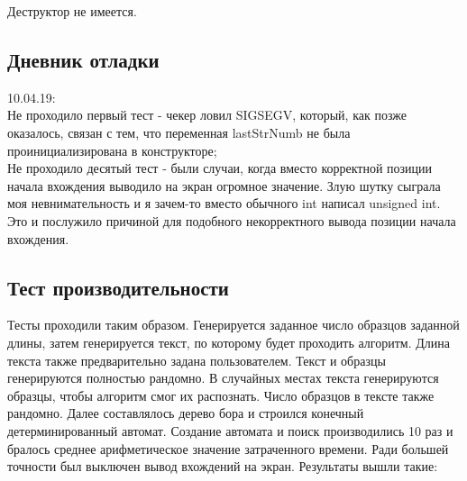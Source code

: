 \documentclass[12pt]{article}
\begin{document}
Деструктор не имеется.

\subsection*{Дневник отладки}
10.04.19:\\
Не проходило первый тест - чекер ловил SIGSEGV, который, как позже оказалось, связан с тем, что переменная lastStrNumb не была проинициализирована в конструкторе;\\
Не проходило десятый тест - были случаи, когда вместо корректной позиции начала вхождения выводило на экран огромное значение. Злую шутку сыграла моя невнимательность и я зачем-то вместо обычного int написал unsigned int. Это и послужило причиной для подобного некорректного вывода позиции начала вхождения.

\subsection*{Тест производительности}
Тесты проходили таким образом. Генерируется заданное число образцов заданной длины, затем генерируется текст, по которому будет проходить алгоритм. Длина текста также предварительно задана пользователем. Текст и образцы генерируются полностью рандомно. В случайных местах текста генерируются образцы, чтобы алгоритм смог их распознать. Число образцов в тексте также рандомно. Далее составлялось дерево бора и строился конечный детерминированный автомат. Создание автомата и поиск производились 10 раз и бралось среднее арифметическое значение затраченного времени. Ради большей точности был выключен вывод вхождений на экран. Результаты вышли такие:
\end{document}
